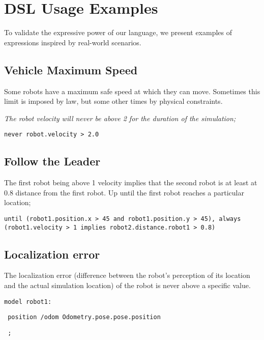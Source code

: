 \chapter{DSL Usage Examples}
\label{chap:languageexamples}


To validate the expressive power of our language, we present examples of expressions inspired by real-world scenarios.


\section{Vehicle Maximum Speed}

Some robots have a maximum safe speed at which they can move. Sometimes this limit is imposed by law, but some other times by physical constraints.


\textit{The robot velocity will never be above 2 for the duration of the simulation;}


\texttt{never robot.velocity > 2.0}

\section{Follow the Leader}

The first robot being above 1 velocity implies that the second robot is at least at 0.8 distance from the first robot. Up until the first robot reaches a particular location;


\texttt{until (robot1.position.x > 45 and robot1.position.y > 45), always (robot1.velocity > 1 implies robot2.distance.robot1 > 0.8)}


\section{Localization error}

The localization error (difference between the robot's perception of its location and the actual simulation location) of the robot is never above a specific value.

\texttt{model robot1:}

\texttt{    position /odom Odometry.pose.pose.position}

\texttt{    ;}

